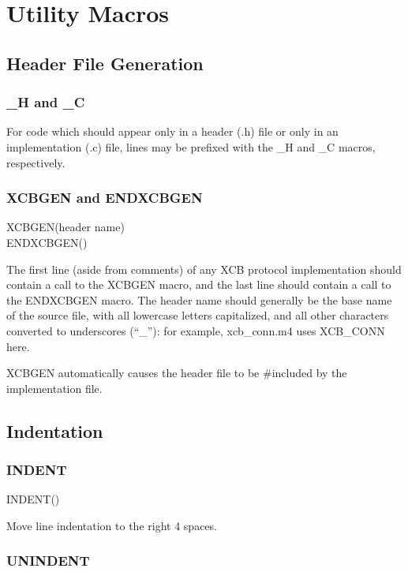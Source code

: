 \documentclass{article}
\begin{document}
\section{Utility Macros}


\subsection{Header File Generation}


\subsubsection{\_H and \_C}

For code which should appear only in a header (.h) file or only in
an implementation (.c) file, lines may be prefixed with the \_H and
\_C macros, respectively.


\subsubsection{XCBGEN and ENDXCBGEN}

XCBGEN(header name)\\
ENDXCBGEN()

The first line (aside from comments) of any XCB protocol implementation
should contain a call to the XCBGEN macro, and the last line should
contain a call to the ENDXCBGEN macro. The header name should generally
be the base name of the source file, with all lowercase letters capitalized,
and all other characters converted to underscores ({}``\_''): for
example, xcb\_conn.m4 uses XCB\_CONN here.

XCBGEN automatically causes the header file to be \#included by the
implementation file.


\subsection{Indentation}


\subsubsection{INDENT}

INDENT()

Move line indentation to the right 4 spaces.


\subsubsection{UNINDENT}
\end{document}
